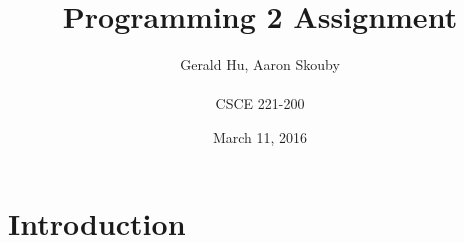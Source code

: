 \documentclass{article}
\begin{document}
\title{\textbf{Programming 2 Assignment}}
\author{Gerald Hu, Aaron Skouby \\ \\CSCE 221-200}
\date{March 11, 2016}
\maketitle
\section*{Introduction}
\end{document}
